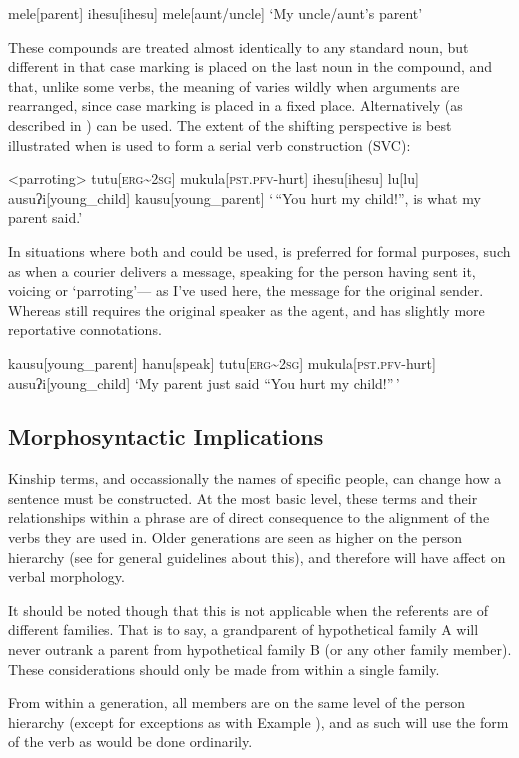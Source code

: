 \ex
\begingl
mele[parent]
ihesu[ihesu]
mele[aunt/uncle]
\glft `My uncle/aunt's parent'
\endgl
\xe

These compounds are treated almost identically to any standard noun, but different in that case marking is placed on the last noun in the compound, and that, unlike some verbs, the meaning of  varies wildly when arguments are rearranged, since case marking is placed in a fixed place. Alternatively  (as described in ) can be used. The extent of the shifting perspective is best illustrated when  is used to form a serial verb construction (SVC):

\ex<parroting>
\begingl
tutu[\textsc{erg\textasciitilde 2sg}]
mukula[\textsc{pst.pfv-}hurt]
ihesu[ihesu]
lu[lu]
ausuʔi[young\_child]
kausu[young\_parent]
\glft `\,``You hurt my child!'', is what my parent said.'
\endgl
\xe

In situations where both  and  could be used,  is preferred for formal purposes, such as when a courier delivers a message, speaking for the person having sent it, voicing or `parroting'--- as I've used here, the message for the original sender. Whereas  still requires the original speaker as the agent, and has slightly more reportative connotations.

\ex
\begingl
kausu[young\_parent]
hanu[speak]
tutu[\textsc{erg\textasciitilde 2sg}]
mukula[\textsc{pst.pfv-}hurt]
ausuʔi[young\_child]
\glft `My parent just said ``You hurt my child!''\,'
\endgl
\xe

\subsection{Morphosyntactic Implications}
Kinship terms, and occassionally the names of specific people, can change how a sentence must be constructed. At the most basic level, these terms and their relationships within a phrase are of direct consequence to the alignment of the verbs they are used in. Older generations are seen as higher on the person hierarchy (see  for general guidelines about this), and therefore will have affect on verbal morphology.

It should be noted though that this is not applicable when the referents are of different families. That is to say, a grandparent of hypothetical family A will never outrank a parent from hypothetical family B (or any other family member). These considerations should only be made from within a single family.

From within a generation, all members are on the same level of the person hierarchy (except for exceptions as with Example ), and as such will use the form of the verb as would be done ordinarily.
